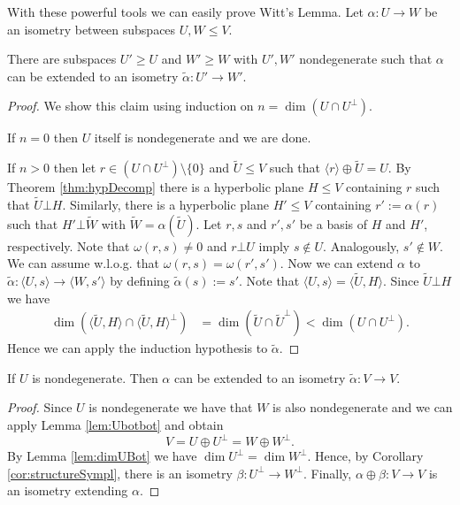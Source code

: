 With these powerful tools we can easily prove Witt's Lemma.
Let $\alpha\colon U\to W$ be an isometry between subspaces $U,W\leq V$.
\begin{lemma}\label{lem:wittPrep1}
	There are subspaces $U'\geq U$ and $W'\geq W$ with $U',W'$ nondegenerate such that $\alpha$ can be extended to an isometry $\tilde{\alpha}\colon U'\to W'$.
\end{lemma}
\begin{proof}
	We show this claim using induction on $n=\dim (U\cap U^\bot)$.
				
	If $n=0$ then $U$ itself is nondegenerate and we are done.
				
	If $n>0$ then let $r\in (U\cap U^\bot)\setminus\{0\}$ and $\tilde U\leq V$ such that $\langle r\rangle\oplus \tilde U=U$. By Theorem \ref{thm:hypDecomp} there is a hyperbolic plane $H\leq V$ containing $r$ such that $\tilde U\bot H$. 
	Similarly, there is a hyperbolic plane $H'\leq V$ containing $r':=\alpha(r)$ such that $H'\bot\tilde{W}$ with $\tilde{W}=\alpha(\tilde{U})$. Let $r,s$ and $r',s'$ be a basis of $H$ and $H'$, respectively. Note that $\omega(r,s)\not=0$ and $r\bot U$ imply $s\notin U$. Analogously, $s'\notin W$. We can assume w.l.o.g. that $\omega(r,s)=\omega(r',s')$. Now we can extend $\alpha$ to $\tilde{\alpha}\colon \langle U,s\rangle\to \langle W,s'\rangle$ by defining $\tilde\alpha (s):= s'$. Note that $\langle U,s\rangle=\langle \tilde{U},H\rangle$. Since $\tilde{U}\bot H$ we have
	\begin{align*}
		\dim(\langle \tilde{U},H\rangle \cap \langle \tilde{U},H\rangle^\bot) & =\dim(\tilde{U}\cap \tilde{U}^\bot)<\dim(U\cap U^\bot). 
	\end{align*}
	Hence we can apply the induction hypothesis to $\tilde{\alpha}$.
\end{proof}
		
\begin{lemma}\label{lem:wittPrep2}
	If $U$ is nondegenerate. Then $\alpha$ can be extended to an isometry $\tilde{\alpha}\colon V\to V$.
\end{lemma}
\begin{proof}
	Since $U$ is nondegenerate we have that $W$ is also nondegenerate and we can apply Lemma \ref{lem:Ubotbot} and obtain \[V=U\oplus U^\bot=W\oplus W^\bot.\]
	By Lemma \ref{lem:dimUBot} we have $\dim U^\bot=\dim W^\bot$. Hence, by Corollary \ref{cor:structureSympl}, there is an isometry $\beta\colon U^\bot\to W^\bot$. Finally, $\alpha\oplus \beta\colon V\to V$ is an isometry extending $\alpha$.
\end{proof}
		
